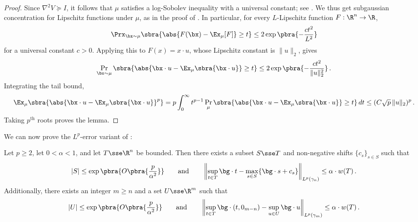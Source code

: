 \documentclass[11pt]{article}
\begin{document}
\begin{proof}
	Since $\nabla^2V\succeq I$, it follows that $\mu$ satisfies a log-Sobolev inequality with a universal constant; see  \cite[Problem~3.19(d)]{rvh-notes}.  
	We thus get subgaussian concentration for Lipschitz functions under $\mu$, as in the proof of \cite[Theorem~3.25]{rvh-notes}.  
	In particular, for every $L$-Lipschitz function
	$F:\R^n\to\R$,
	\[
		\Prx_{\bx\sim\mu}
		\sbra{
			\abs{F(\bx)-\Ex_\mu[F]}\geq t
		}
		\leq
		2\exp\pbra{
			-\frac{c t^2}{L^2}
		}
	\]
	for a universal constant $c>0$.  Applying this to
	$F(x)=x\cdot u$, whose Lipschitz constant is $\|u\|_2$, gives
	\[
		\Pr_{\bx\sim\mu}
		\sbra{
			\abs{\bx\cdot u-\Ex_\mu\sbra{\bx\cdot u}}\geq t
		}
		\leq
		2\exp\pbra{
			-\frac{c t^2}{\|u\|_2^2}
		}\,.
	\]
	Integrating the tail bound,
	\[
		\Ex_\mu
		\sbra{
			\abs{\bx\cdot u-\Ex_\mu\sbra{\bx\cdot u}}^p
		}
		=
		p\int_0^\infty
		t^{p-1}
		\Pr_\mu
		\sbra{
			\abs{\bx\cdot u-\Ex_\mu\sbra{\bx\cdot u}}\geq t
		}
		\,dt
		\leq
		(C\sqrt p\,\|u\|_2)^p\,.
	\]
	Taking $p^{\text{th}}$ roots proves the lemma. 
\end{proof}

We can now prove the $L^p$-error variant of : 

\begin{corollary}[$L^p$ sparsification]
\label{cor:lp}
	Let $p\geq2$, let $0<\alpha<1$, and let $T\sse\R^n$ be bounded.  
	Then there exists a subset $S\sse T$ and non-negative shifts $\{c_s\}_{s\in S}$ such
	that
	\[
		|S|
		\leq
		\exp\pbra{
			O\pbra{
				\frac{p}{\alpha^2}
			}
		}
		\qquad\text{and}\qquad 
		\left\|
			\sup_{t\in T}\bg\cdot t-\max_{s\in S}\{\bg\cdot s+c_s\}
		\right\|_{L^p(\gamma_n)}
		\leq
		\alpha\cdot w(T)\,.
	\]
	Additionally, there exists an integer $m\geq n$ and a set $U \sse \R^m$ such that  
	\[
		|U|
		\leq
		\exp\pbra{
			O\pbra{
				\frac{p}{\alpha^2}
			}
		}
		\qquad\text{and}\qquad 
		\left\|
			\sup_{t\in T}\bg\cdot(t,0_{m-n})-\sup_{u\in U}\bg\cdot u 
		\right\|_{L^p(\gamma_m)}
		\leq
		\alpha\cdot w(T)\,.
	\]
\end{corollary}
\end{document}
